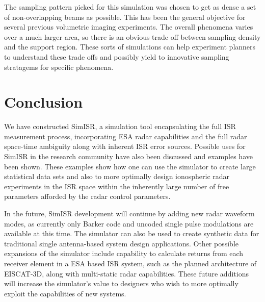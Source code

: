 \documentclass[draft,ras]{agutex}
\begin{document}
\begin{article}
The sampling pattern picked for this simulation was chosen to get as dense a set of non-overlapping beams as possible.  This has been the general objective for several previous volumetric imaging experiments.
The overall phenomena varies over a much larger area, so there is an obvious trade off between sampling density and the support region. These sorts of simulations can help experiment planners to understand these trade offs and possibly yield to innovative sampling stratagems for specific phenomena. 

\section{Conclusion}
We have constructed SimISR, a simulation tool encapsulating the full ISR measurement process, incorporating ESA radar capabilities and the full radar space-time ambiguity along with inherent ISR error sources. Possible uses for SimISR in the research community have also been discussed and examples have been shown. These examples show how one can use the simulator to create large statistical data sets and also to more optimally design ionospheric radar experiments in the ISR space within the inherently large number of free parameters afforded by the radar control parameters. 

In the future, SimISR development will continue by adding new radar waveform modes, as currently only Barker code and uncoded single pulse modulations are available at this time. The simulator can also be used to create synthetic data for traditional single antenna-based system design applications. Other possible expansions of the simulator include capability to calculate returns from each receiver element in a ESA based ISR system, such as the planned architecture of EISCAT-3D, along with multi-static radar capabilities. These future additions will increase the simulator's value to designers who wish to more optimally exploit the capabilities of new systems. 


\end{article}
\end{document}
